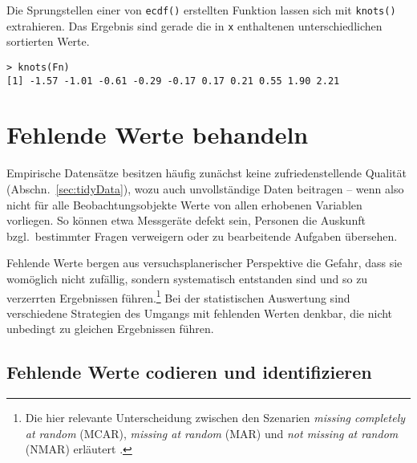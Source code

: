 Die Sprungstellen einer von \lstinline!ecdf()! erstellten Funktion lassen sich mit \lstinline!knots()! extrahieren. Das Ergebnis sind gerade die in \lstinline!x! enthaltenen unterschiedlichen sortierten Werte.
\begin{lstlisting}
> knots(Fn)
[1] -1.57 -1.01 -0.61 -0.29 -0.17 0.17 0.21 0.55 1.90 2.21
\end{lstlisting}

\section{Fehlende Werte behandeln}
\label{sec:na}

Empirische Datensätze besitzen häufig zunächst keine zufriedenstellende Qualität (Abschn.\ \ref{sec:tidyData}), wozu auch unvollständige Daten beitragen -- wenn also nicht für alle Beobachtungsobjekte Werte von allen erhobenen Variablen vorliegen. So können etwa Messgeräte defekt sein, Personen die Auskunft bzgl.\ bestimmter Fragen verweigern oder zu bearbeitende Aufgaben übersehen.

Fehlende Werte bergen aus versuchsplanerischer Perspektive die Gefahr, dass sie womöglich nicht zufällig, sondern systematisch entstanden sind und so zu verzerrten Ergebnissen führen.\footnote{Die hier relevante Unterscheidung zwischen den Szenarien \emph{missing completely at random} (MCAR), \emph{missing at random} (MAR) und \emph{not missing at random} (NMAR) erläutert .} Bei der statistischen Auswertung sind verschiedene Strategien des Umgangs mit fehlenden Werten denkbar, die nicht unbedingt zu gleichen Ergebnissen führen.

\subsection{Fehlende Werte codieren und identifizieren}
\label{sec:isna}

